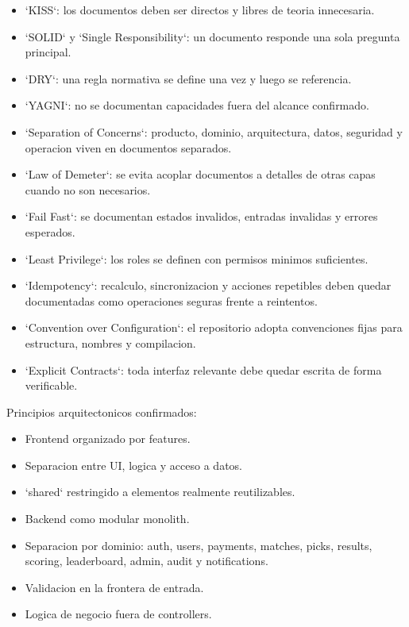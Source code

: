 \begin{itemize}
  \item `KISS`: los documentos deben ser directos y libres de teoria innecesaria.
  \item `SOLID` y `Single Responsibility`: un documento responde una sola pregunta principal.
  \item `DRY`: una regla normativa se define una vez y luego se referencia.
  \item `YAGNI`: no se documentan capacidades fuera del alcance confirmado.
  \item `Separation of Concerns`: producto, dominio, arquitectura, datos, seguridad y operacion viven en documentos separados.
  \item `Law of Demeter`: se evita acoplar documentos a detalles de otras capas cuando no son necesarios.
  \item `Fail Fast`: se documentan estados invalidos, entradas invalidas y errores esperados.
  \item `Least Privilege`: los roles se definen con permisos minimos suficientes.
  \item `Idempotency`: recalculo, sincronizacion y acciones repetibles deben quedar documentadas como operaciones seguras frente a reintentos.
  \item `Convention over Configuration`: el repositorio adopta convenciones fijas para estructura, nombres y compilacion.
  \item `Explicit Contracts`: toda interfaz relevante debe quedar escrita de forma verificable.
\end{itemize}

Principios arquitectonicos confirmados:

\begin{itemize}
  \item Frontend organizado por features.
  \item Separacion entre UI, logica y acceso a datos.
  \item `shared` restringido a elementos realmente reutilizables.
  \item Backend como modular monolith.
  \item Separacion por dominio: auth, users, payments, matches, picks, results, scoring, leaderboard, admin, audit y notifications.
  \item Validacion en la frontera de entrada.
  \item Logica de negocio fuera de controllers.
\end{itemize}

